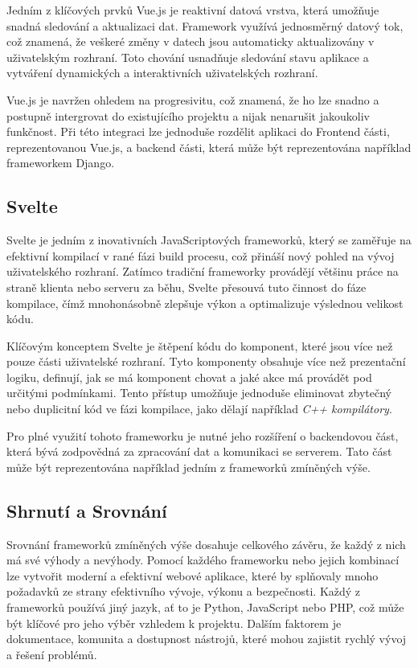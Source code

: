 Jedním z klíčových prvků Vue.js je reaktivní datová vrstva, která umožňuje snadná sledování a aktualizaci dat. Framework využívá jednosměrný datový tok, což znamená, že veškeré změny v datech jsou automaticky aktualizovány v uživatelským rozhraní. Toto chování usnadňuje sledování stavu aplikace a vytváření dynamických a interaktivních uživatelských rozhraní.

Vue.js je navržen ohledem na progresivitu, což znamená, že ho lze snadno a postupně intergrovat do existujícího projektu a nijak nenarušit jakoukoliv funkčnost. Při této integraci lze jednoduše rozdělit aplikaci do Frontend části, reprezentovanou Vue.js, a backend části, která může být reprezentována například frameworkem Django. \cite{about_vuejs}

\subsection{Svelte}
\label{subsec:dev-framework-svelte}
Svelte je jedním z inovativních JavaScriptových frameworků, který se zaměřuje na efektivní kompilací v rané fázi build procesu, což přináší nový pohled na vývoj uživatelského rozhraní. Zatímco tradiční frameworky provádějí většinu práce na straně klienta nebo serveru za běhu, Svelte přesouvá tuto činnost do fáze kompilace, čímž mnohonásobně zlepšuje výkon a optimalizuje výslednou velikost kódu.

Klíčovým konceptem Svelte je štěpení kódu do komponent, které jsou více než pouze části uživatelské rozhraní. Tyto komponenty obsahuje více než prezentační logiku, definují, jak se má komponent chovat a jaké akce má provádět pod určitými podmínkami. Tento přístup umožňuje jednoduše eliminovat zbytečný nebo duplicitní kód ve fázi kompilace, jako dělají například \textit{C++ kompilátory}.

Pro plné využití tohoto frameworku je nutné jeho rozšíření o backendovou část, která bývá zodpovědná za zpracování dat a komunikaci se serverem. Tato část může být reprezentována například jedním z frameworků zmíněných výše. \cite{about_svelte}

\subsection{Shrnutí a Srovnání}
\label{subsec:dev-framework-comparison}
Srovnání frameworků zmíněných výše dosahuje celkového závěru, že každý z nich má své výhody a nevýhody. Pomocí každého frameworku nebo jejich kombinací lze vytvořit moderní a efektivní webové aplikace, které by splňovaly mnoho požadavků ze strany efektivního vývoje, výkonu a bezpečnosti.
Každý z frameworků používá jiný jazyk, ať to je Python, JavaScript nebo PHP, což může být klíčové pro jeho výběr vzhledem k projektu. Dalším faktorem je dokumentace, komunita a dostupnost nástrojů, které mohou zajistit rychlý vývoj a řešení problémů.

